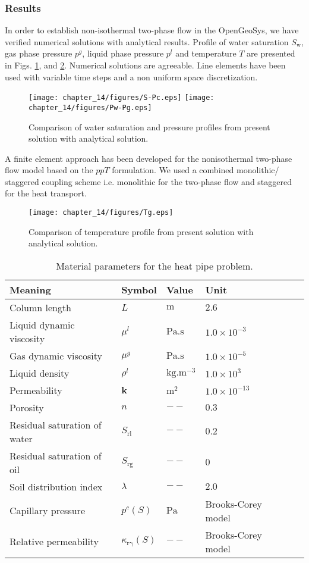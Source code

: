 \subsubsection*{Results}
In order to establish non-isothermal two-phase flow in the OpenGeoSys, we have verified numerical solutions with analytical results. Profile of water saturation $S_{\mathrm w}$, gas phase pressure $p^g$, liquid phase pressure $p^l$ and temperature $T$ are presented in Figs. \ref{Fig:HP2}, and \ref{Fig:HP4}. Numerical solutions are agreeable. Line elements have been used with variable time steps and a non uniform space discretization.
\begin{figure}[thbp]
\centerline{
\texttt{[image: chapter\_14/figures/S-Pc.eps]}
\texttt{[image: chapter\_14/figures/Pw-Pg.eps]}}
\caption{Comparison of water saturation and pressure profiles from present solution with analytical solution.}
\label{Fig:HP2}
\end{figure}
A finite element approach has been developed for the nonisothermal two-phase flow model based on the $ppT$ formulation. We used a combined monolithic/ staggered coupling scheme i.e. monolithic for the two-phase flow and staggered for the heat transport.
\begin{figure}[htb]
\begin{center}
\texttt{[image: chapter\_14/figures/Tg.eps]}
\end{center}
\caption{Comparison of temperature profile from present solution with analytical solution.}
\label{Fig:HP4}
\end{figure}
\begin{table}[htbp]
\caption{Material parameters for the heat pipe problem.}
\label{tab:HP1}
\begin{tabular}{l*{4}{l}r}
\hline
\textbf{Meaning} & \textbf{Symbol} &  \textbf{Value} &  \textbf{Unit} \\
\hline
Column length & $L$ & $\mathrm m$ & $2.6$  \\
Liquid dynamic viscosity &  $\mu^l$ & $\mathrm {Pa.s}$ & $1.0\times10^{-3}$ \\
Gas dynamic viscosity & $\mu^g$ & $\mathrm {Pa.s}$ & $1.0\times10^{-5}$ \\
Liquid density &  $\rho^l$ &$\mathrm {kg.m^{-3}}$ & $1.0\times10^{3}$ \\
Permeability & $\mathbf k$ & $ \mathrm {m^2}$ & $1.0\times 10^{-13}$ \\
Porosity & $n$ & $--$ & $0.3$ \\
Residual saturation of water &  $S_{\mathrm{rl}}$ & $--$ & $0.2$ \\
Residual saturation of oil &  $S_{\mathrm{rg}}$ & $--$ & $0$ \\
Soil distribution index &  $\lambda$ & $--$ & $2.0$ \\
Capillary pressure & $p^c(S)$ & $\mathrm {Pa}$ & Brooks-Corey model\\
Relative permeability & $\kappa_{\mathrm {r\gamma}}(S)$ & $--$ & Brooks-Corey model \\ \hline
\end{tabular}
\end{table}
